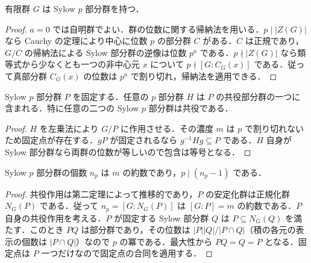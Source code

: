 \begin{prop}[Sylowの第一定理]
有限群 $G$ は Sylow $p$ 部分群を持つ．
\end{prop}
\begin{proof}
$a=0$ では自明群でよい．群の位数に関する帰納法を用いる．$p\mid|Z(G)|$ なら Cauchy の定理により中心に位数 $p$ の部分群 $C$ がある．$C$ は正規であり，$G/C$ の帰納法による Sylow 部分群の逆像は位数 $p^a$ である．$p\nmid|Z(G)|$ なら類等式から少なくとも一つの非中心元 $x$ について $p\nmid[G:C_G(x)]$ である．従って真部分群 $C_G(x)$ の位数は $p^a$ で割り切れ，帰納法を適用できる．
\end{proof}
\begin{prop}[Sylowの第二定理]
Sylow $p$ 部分群 $P$ を固定する．任意の $p$ 部分群 $H$ は $P$ の共役部分群の一つに含まれる．特に任意の二つの Sylow $p$ 部分群は共役である．
\end{prop}
\begin{proof}
$H$ を左乗法により $G/P$ に作用させる．その濃度 $m$ は $p$ で割り切れないため固定点が存在する．$gP$ が固定されるなら $g^{-1}Hg\subseteq P$ である．$H$ 自身が Sylow 部分群なら両群の位数が等しいので包含は等号となる．
\end{proof}
\begin{prop}[Sylowの第三定理]
Sylow $p$ 部分群の個数 $n_p$ は $m$ の約数であり，$p\mid(n_p-1)$ である．
\end{prop}
\begin{proof}
共役作用は第二定理によって推移的であり，$P$ の安定化群は正規化群 $N_G(P)$ である．従って $n_p=[G:N_G(P)]$ は $[G:P]=m$ の約数である．$P$ 自身の共役作用を考える．$P$ が固定する Sylow 部分群 $Q$ は $P\subseteq N_G(Q)$ を満たす．このとき $PQ$ は部分群であり，その位数は $|P||Q|/|P\cap Q|$（積の各元の表示の個数は $|P\cap Q|$）なので $p$ の冪である．最大性から $PQ=Q=P$ となる．固定点は $P$ 一つだけなので固定点の合同を適用する．
\end{proof}
